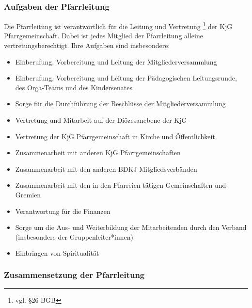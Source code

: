 \documentclass[12pt]{report}
\begin{document}
\begin{flushleft}
\subsubsection{Aufgaben der Pfarrleitung}
Die Pfarrleitung ist verantwortlich für die Leitung und Vertretung \footnote{ vgl. §26 BGB} der KjG Pfarrgemeinschaft.
Dabei ist jedes Mitglied der Pfarrleitung alleine vertretungsberechtigt.
Ihre Aufgaben sind insbesondere:
\begin{itemize}
  \item Einberufung, Vorbereitung und Leitung der Mitgliederversammlung
  \item Einberufung, Vorbereitung und Leitung der Pädagogischen Leitungsrunde, des Orga-Teams und des Kindersenates
  \item Sorge für die Durchführung der Beschlüsse der Mitgliederversammlung
  \item Vertretung und Mitarbeit auf der Diözesanebene der KjG
  \item Vertretung der KjG Pfarrgemeinschaft in Kirche und Öffentlichkeit
  \item Zusammenarbeit mit anderen KjG Pfarrgemeinschaften
  \item Zusammenarbeit mit den anderen BDKJ Mitgliedsverbänden
  \item Zusammenarbeit mit den in den Pfarreien tätigen Gemeinschaften und Gremien
  \item Verantwortung für die Finanzen
  \item Sorge um die Aus- und Weiterbildung der Mitarbeitenden durch den Verband (insbesondere der Gruppenleiter*innen)
  \item Einbringen von Spiritualität
\end{itemize}

\subsubsection{Zusammensetzung der Pfarrleitung}


\end{flushleft}
\end{document}
